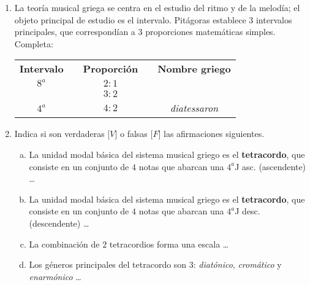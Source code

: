 \documentclass[letterpaper,12pt,notitlepage,spanish]{article}
\begin{document}
 \begin{ejercicio}
		\begin{enumerate}[1.-]
%
%
			\item La teoría musical griega se centra en el estudio del ritmo y de la melodía; el objeto principal de estudio es el intervalo. Pitágoras establece 3 intervalos principales, que correspondían a 3 proporciones matemáticas simples. Completa: \par
		\begin{center}
			\begin{tabular}{c c c c c}
			\vspace{0.25cm}
			\textbf{Intervalo}  &  &  \textbf{Proporción}  &  &  \textbf{Nombre griego}  \\ 
			\vspace{0.25cm}
			$ 8^a $  &  &  $ 2:1 $  &  &  \dotfill  \\ 
			\vspace{0.25cm}
			\dotfill &  &  $ 3:2 $  &  &  \dotfill \\ 
			\vspace{0.25cm}
			$ 4^a $  &  &  $ 4:2 $  &  & \textit{diatessaron}     \\
			\end{tabular}
		\end{center}
%
%
			\item  Indica si son verdaderas [$V$] o falsas [$F$] las afirmaciones siguientes.
		\begin{enumerate}[a)]
		\item	La unidad modal básica del sistema musical griego es el \textbf{tetracordo}, que consiste en un conjunto de $4$ notas que abarcan una $4^a$J asc. (ascendente) \ldots
		\item	La unidad modal básica del sistema musical griego es el \textbf{tetracordo}, que consiste en un conjunto de $4$ notas que abarcan una $4^a$J desc. (descendente) \ldots
		\item	La combinación de $2$ tetracordios forma una escala \ldots
		\item	Los géneros principales del tetracordo son $3$: \textit{diatónico}, \textit{cromático} y \textit{enarmónico}  \ldots
		\end{enumerate}
%
		\end{enumerate}
 \end{ejercicio}
%
%
\end{document}
